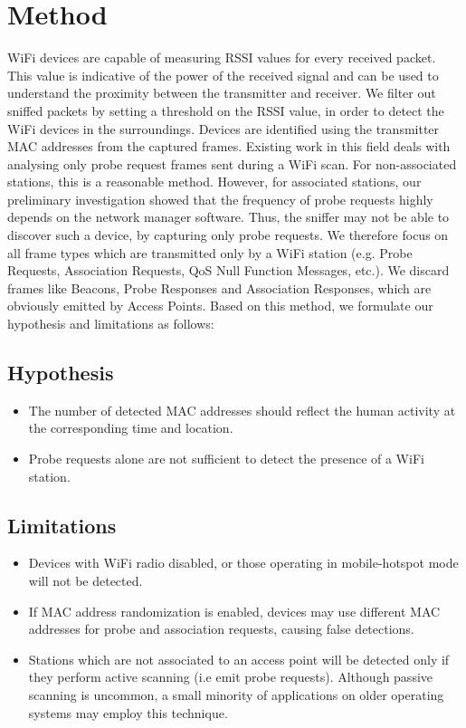 \section{Method}

WiFi devices are capable of measuring RSSI values for every received packet. This value is indicative of the power of the received signal and can be used to understand the proximity between the transmitter and receiver. We filter out sniffed packets by setting a threshold on the RSSI value, in order to detect the WiFi devices in the surroundings. Devices are identified using the transmitter MAC addresses from the captured frames. Existing work in this field deals with analysing only probe request frames sent during a WiFi scan. For non-associated stations, this is a reasonable method. However, for associated stations, our preliminary investigation showed that the frequency of probe requests highly depends on the network manager software. Thus, the sniffer may not be able to discover such a device, by capturing only probe requests. We therefore focus on all frame types which are transmitted only by a WiFi station (e.g. Probe Requests, Association Requests, QoS Null Function Messages, etc.). \cite{noauthor_802.11_2010} We discard frames like Beacons, Probe Responses and Association Responses, which are obviously emitted by Access Points. Based on this method, we formulate our hypothesis and limitations as follows:

\subsection{Hypothesis}
\begin{itemize}
    \item The number of detected MAC addresses should reflect the human activity at the corresponding time and location.
    \item Probe requests alone are not sufficient to detect the presence of a WiFi station.
\end{itemize}

\subsection{Limitations}
\begin{itemize}
    \item Devices with WiFi radio disabled, or those operating in mobile-hotspot mode will not be detected.
    \item If MAC address randomization is enabled, devices may use different MAC addresses for probe and association requests, causing false detections.
    \item Stations which are not associated to an access point will be detected only if they perform active scanning (i.e emit probe requests). Although passive scanning is uncommon, a small minority of applications on older operating systems may employ this technique.\cite{lockwood_a5ec95cdb1a7d2024249277dff1f99d0046c9b56_nodate}
\end{itemize}